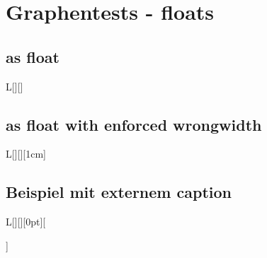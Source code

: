 \documentclass[Typ=Mitschrieb,Vorlesung=LAII]{Lilly}
\begin{document}
\clearpage
\section{Graphentests - floats}
    \subsection{as float}
    \begin{wgraph}{L}[][]
        \plotline[Veronica]{\x*\x}
    \end{wgraph}\lipsum[6-8]

\subsection{as float with enforced wrongwidth}
    \begin{wgraph}{L}[][][1cm]
        \plotline[Amber]{\x*\x}
    \end{wgraph}\lipsum[6-8]

\subsection{Beispiel mit externem caption}
    \begin{wgraph}{L}[][][0pt][\caption{Wichtiger Graph}]
        \plotline[Aureolin]{\x*\x}
    \end{wgraph}\lipsum[6-8]
\end{document}
